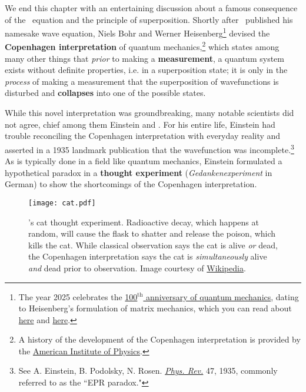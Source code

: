 We end this chapter with an entertaining discussion about a famous consequence of the \Sch\ equation and the principle of superposition. 
Shortly after \Sch\ published his namesake wave equation, Niels Bohr and Werner Heisenberg\footnote{The year 2025 celebrates the \href{https://quantum2025.org/}{100$^{\text{th}}$ anniversary of quantum mechanics}, dating to Heisenberg's formulation of matrix mechanics, which you can read about \href{https://www.aps.org/apsnews/2025/07/werner-heisenberg-pioneers-quantum-mechanics}{here} and \href{https://home.cern/news/news/physics/century-quantum-mechanics}{here}.} devised the \textbf{Copenhagen interpretation} of quantum mechanics,\footnote{A history of the development of the Copenhagen interpretation is provided by the \href{https://history.aip.org/exhibits/heisenberg/triumph.html}{American Institute of Physics}.} which states among many other things that \emph{prior} to making a \textbf{measurement}, a quantum system exists without definite properties, i.e. in a superposition state; 
it is only in the \emph{process} of making a measurement that the superposition of wavefunctions is disturbed and \textbf{collapses} into one of the possible states. 

While this novel interpretation was groundbreaking, many notable scientists did not agree, chief among them Einstein and \Sch. 
For his entire life, Einstein had trouble reconciling the Copenhagen interpretation with everyday reality and asserted in a 1935 landmark publication that the wavefunction was incomplete.\footnote{See A. Einstein, B. Podolsky, N. Rosen. \href{https://journals.aps.org/pr/abstract/10.1103/PhysRev.47.777}{\emph{Phys. Rev.}} 47, 1935, commonly referred to as the ``EPR paradox."} 
As is typically done in a field like quantum mechanics, Einstein formulated a hypothetical paradox in a \textbf{thought experiment} (\emph{Gedankenexperiment} in German) to show the shortcomings of the Copenhagen interpretation.

\begin{figure}[!h]
	\centering
	\texttt{[image: cat.pdf]}
	\caption{\Sch's cat thought experiment. 
	Radioactive decay, which happens at random, will cause the flask to shatter and release the poison, which kills the cat. 
	While classical observation says the cat is alive \emph{or} dead, the Copenhagen interpretation says the cat is \emph{simultaneously} alive \emph{and} dead prior to observation. 
	Image courtesy of \href{https://en.wikipedia.org/wiki/Schrödinger\%27s_cat}{Wikipedia}.}
	\label{fig:cat}
\end{figure}

